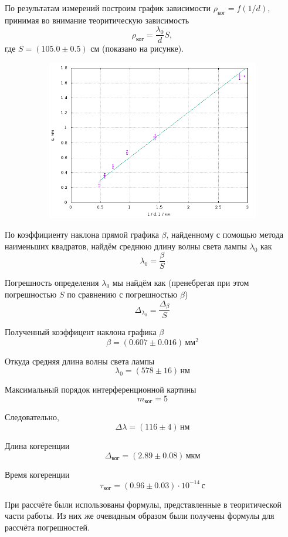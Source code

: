 \documentclass[12pt]{article}
\begin{document}
\par
	По результатам измерений построим график зависимости $\rho_\text{ког} = f(1 / d)$, принимая во внимание теоритическую зависимость
\[
	\rho_\text{ког} = \frac{\lambda_0}{d} S,
\]
где $S = \left(105.0 \pm 0.5\right)$ см (показано на рисунке).
\begin{figure}[h!]
	\centering
	\includegraphics[width = 14cm, height = 7cm]{plot1.png}
\end{figure}
\par
	По коэффициенту наклона прямой графика $\beta$, найденному с помощью метода наименьших квадратов, найдём среднюю длину волны света лампы $\lambda_0$ как
\[
	\lambda_0 = \frac{\beta}{S}
\]
\par
	Погрешность определения $\lambda_0$ мы найдём как (пренебрегая при этом погрешностью $S$ по сравнению с погрешностью $\beta$)
\[
	\Delta_\text{$\lambda_0$} = \frac{\Delta_\beta}{S}
\]
\par
	Полученный коэффицент наклона графика $\beta$
\[
	\beta = \left(0.607 \pm 0.016 \right) \, \text{мм}^2
\]
\par
	Откуда средняя длина волны света лампы
\[
	\lambda_0 = \left(578 \pm 16 \right) \, \text{нм}
\]
\par
	Максимальный порядок интерференционной картины 
\[
	m_\text{ког} = 5
\]
\par
	Следовательно,
\[
	\Delta \lambda = \left(116 \pm 4\right) \, \text{нм}
\]
\par
	Длина когеренции
\[
	\Delta_\text{ког} = \left(2.89 \pm 0.08 \right) \, \text{мкм}
\]
\par
	Время когеренции
\[
	\tau_\text{ког} = \left(0.96 \pm 0.03 \right) \cdot 10^{-14} \, \text{с}
\]
\par
	При рассчёте были использованы формулы, представленные в теоритической части работы. Из них же очевидным образом были получены формулы для рассчёта погрешностей.
\end{document}
